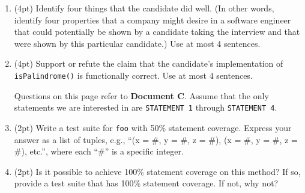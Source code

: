 \documentclass{report}
\newif\ifkey
\newcommand{\answerlong}[1]{\ifkey\color{red}\textbf{#1}\color{black}\else\vspace{0.5in}\fi\xspace}
\newcommand*{\pts}[1]{\addtocounter{points}{#1}(#1pt)}
\begin{document}
\begin{spacing}{1.4}
\begin{enumerate}[leftmargin=*]
  \item \pts{4}  Identify four things that the candidate did well. (In other words, identify four properties that a company might
desire in a software engineer that could potentially be shown by a candidate taking the interview and that were shown by this
particular candidate.) Use at most 4 sentences.\\
\answerlong{Answers will vary. Potential solutions include the following:
1. The candidate provided inline comments explaining some of their code.
2. The candidate asked relevant questions regarding code functionality.
3. The candidate has consistent indentation.
4. The candidate used a descriptive variable name.}

\item \pts{4} Support or refute the claim that the candidate's implementation of \lstinline{isPalindrome()} is functionally correct. Use
  at most 4 sentences.\\
  \answerlong{Refute. The candidate's implementation of isPalindrome() is not functionally correct. The candidate missed a base
case regarding x being a negative number. Negative integers would not count as a palindrome. {-313} reversed is {313-}.}
    
    \newpage

    Questions on this page refer to \textbf{Document C}.
    Assume that the only statements we are interested in are \lstinline{STATEMENT 1} through \lstinline{STATEMENT 4}.

  \item \label{sl1} \pts{2} Write a test suite for \lstinline{foo} with 50\% statement coverage. Express your answer as a list of tuples, e.g., ``(x = \#, y = \#, z = \#), (x = \#, y = \#, z = \#), etc.'', where each ``\#'' is a specific integer. \\
  \answerlong{(x = 6, y = 0, z = 3)}
    
  \item \pts{2} Is it possible to achieve 100\% statement coverage on this method? If so, provide a test suite that has 100\% statement coverage. If not, why not? \\
    \answerlong{It is not possible, because STATEMENT 2 is unreachable.}


\end{enumerate}
\end{spacing}
\end{document}
